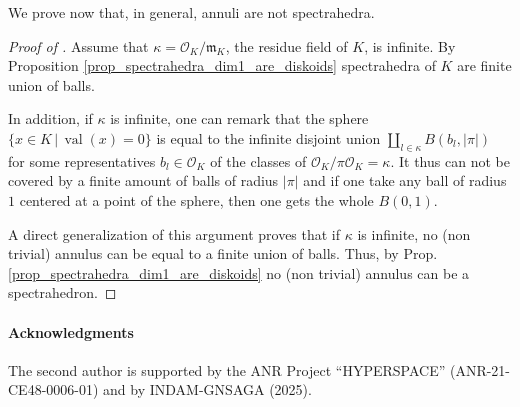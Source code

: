 \documentclass{elsarticle}
\theoremstyle{plain}
\theoremstyle{definition}
\DeclareMathOperator{\val}{val}
\newcommand{\OK}{\mathcal{O}_K}
\begin{document}
We prove now that, in general, annuli are not spectrahedra.

\begin{proof}[{Proof of }]
Assume that $\kappa = \OK/\mathfrak{m}_K$, the residue field of $K$, is infinite.
By Proposition \ref{prop_spectrahedra_dim1_are_diskoids} spectrahedra of $K$ are finite union of balls.

In addition, if $\kappa$ is infinite, one can remark that the sphere
$\{x \in K \,|\,  \val(x) =0\}$ is equal to the infinite disjoint union $\amalg_{l \in \kappa} B(b_l, \vert \pi \vert)$ for some representatives $b_l \in \OK$ of the classes of $\OK / \pi\OK = \kappa.$
It thus can not be covered by a finite amount of balls of radius $\vert \pi \vert$
and if one take any ball of radius $1$ centered at a point of the sphere, then one gets the whole
$B(0,1).$

A direct generalization of this argument proves that
if $\kappa$ is infinite, no (non trivial) annulus can be equal to
a finite union of balls. Thus, by Prop. \ref{prop_spectrahedra_dim1_are_diskoids} no (non trivial) annulus can be a spectrahedron.
\end{proof}



\paragraph*{Acknowledgments}
The second author is supported by the ANR Project ``HYPERSPACE'' (ANR-21-CE48-0006-01)
and by INDAM-GNSAGA (2025).



\end{document}
